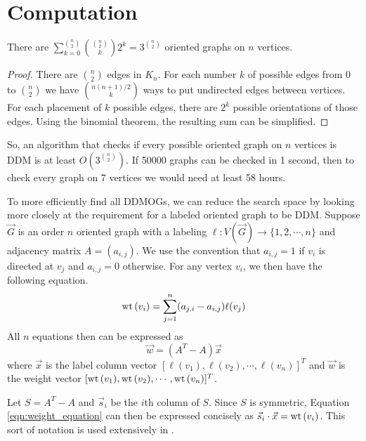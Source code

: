 \section{Computation}

\begin{proposition}
There are 
\(\displaystyle
\sum_{k=0}^{\binom{n}{2}} \binom{\binom{n}{2}}{k} 2^k = 3^{\binom{n}{2}}
\)
oriented graphs on \(n\) vertices.
\end{proposition}
\begin{proof}
There are \(\binom{n}{2}\) edges in \(K_n\).
For each number \(k\) of possible edges from \(0\) to \(\binom{n}{2}\)
we have \(\binom{n(n+1)/2}{k}\) ways to put undirected edges between
vertices.
For each placement of \(k\) possible edges, there
are \(2^k\) possible orientations of those edges.
Using the binomial theorem, the resulting sum can be simplified.
\end{proof}

So, an algorithm that checks if every possible oriented graph on \(n\) vertices is DDM is at least \(O(3^{\binom{n}{2}})\).
If 50000 graphs can be checked in 1 second, then to check every graph on 7 vertices
we would need at least 58 hours.

To more efficiently find all DDMOGs, we can reduce the search space by looking more closely at the requirement
for a labeled oriented graph to be DDM.
Suppose \(\vec{G}\) is an order \(n\) oriented graph with a labeling \(\ell: V(\vec{G}) \rightarrow \{1, 2, \cdots, n\}\)
and adjacency matrix \(A = (a_{i,j})\).
We use the convention that \(a_{i,j} = 1\) if \(v_i\) is directed at \(v_j\) and \(a_{i,j} = 0\) otherwise.
For any vertex \(v_i\), we then have the following equation.
\begin{equation}
    \label{eqn:weight_equation}
    \mathrm{wt}\,(v_i) = \sum_{j=1}^n (a_{j,i}-a_{i,j}) \ell(v_j)
\end{equation}
All \(n\) equations then can be expressed as
\begin{equation}
    \label{eqn:matrix_weight_equation}
\vec{w} = (A^{T} - A)\vec{x}
\end{equation}
where \(\vec{x}\) is the label column vector \([\ell(v_1), \ell(v_2), \cdots, \ell(v_n)]^{T}\)
and \(\vec{w}\) is the weight vector \([\mathrm{wt}\,(v_1), \mathrm{wt}\,(v_2), \cdots, \mathrm{wt}\,(v_n)]^T\).

Let \(S = A^{T} - A\) and \(\vec{s}_i\) be the \(i\)th column of \(S\).
Since \(S\) is symmetric, Equation \ref{eqn:weight_equation} can then be expressed concisely
as \(\vec{s}_i \cdot \vec{x} = \mathrm{wt}\,(v_i)\).
This sort of notation is used extensively in \cite{aceskaNewResultsDifference2025}.


